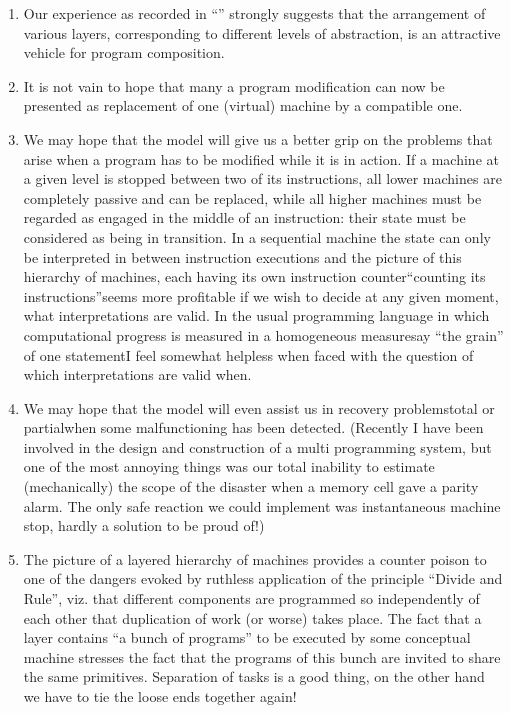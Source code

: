 \documentclass[twoside,11pt]{book}
\begin{document}
\begin{enumerate}[wide, nosep, label=(\arabic*)]
	\item Our experience as recorded in ``'' strongly suggests that the arrangement of various layers, corresponding to different levels of abstraction, is an attractive vehicle for program composition.

	\item It is not vain to hope that many a program modification can now be presented as replacement of one (virtual) machine by a compatible one.

	\item We may hope that the model will give us a better grip on the problems that arise when a program has to be modified while it is in action. If a machine at a given level is stopped between two of its instructions, all lower  machines are completely passive and can be replaced, while all higher machines must be regarded as engaged in the middle of an instruction: their state must be considered as being in transition. In a sequential machine the state can only be interpreted in between instruction executions and the picture of this hierarchy of machines, each having its own instruction counter\textemdash{}``counting its instructions''\textemdash{}seems more profitable if we wish to decide at any given moment, what interpretations are valid. In the usual programming language in which computational progress is measured in a homogeneous measure\textemdash{}say ``the grain'' of one statement\textemdash{}I feel somewhat helpless when faced with the question of which interpretations are valid when.
	
	\item We may hope that the model will even assist us in recovery problems\textemdash{}total or partial\textemdash{}when some malfunctioning has been detected. (Recently I have been involved in the design and construction of a multi programming system, but one of the most annoying things was our total inability to estimate (mechanically) the scope of the disaster when a memory cell gave a parity alarm. The only safe reaction we could implement was instantaneous machine stop, hardly a solution to be proud of!)
	
	\item The picture of a layered hierarchy of machines provides a counter 	poison to one of the dangers evoked by ruthless application of the principle ``Divide and Rule'', viz. that different components are programmed so independently of each other that duplication of work (or worse) takes place. The fact that a layer contains ``a bunch of programs'' to be executed by some conceptual machine stresses the fact that the programs of this bunch are invited to share the same primitives. Separation of tasks is a good thing, on the other hand we have to tie the loose ends together again!
\end{enumerate}
\end{document}
